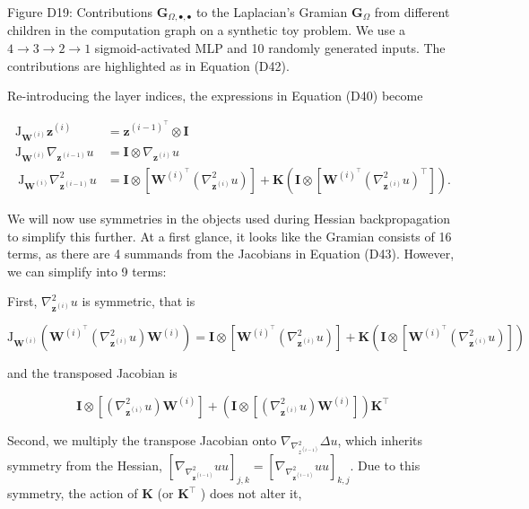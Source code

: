 \documentclass[10pt]{article}
\begin{document}
Figure D19: Contributions $\boldsymbol{G}_{\Omega, \bullet, \bullet}$ to the Laplacian's Gramian $\boldsymbol{G}_{\Omega}$ from different children in the computation graph on a synthetic toy problem. We use a $4 \rightarrow 3 \rightarrow 2 \rightarrow 1$ sigmoid-activated MLP and 10 randomly generated inputs. The contributions are highlighted as in Equation (D42).

Re-introducing the layer indices, the expressions in Equation (D40) become


\begin{align*}
\mathrm{J}_{\boldsymbol{W}^{(i)}} \boldsymbol{z}^{(i)} & =\boldsymbol{z}^{(i-1)^{\top}} \otimes \boldsymbol{I} \\
\mathrm{J}_{\boldsymbol{W}^{(i)}} \nabla_{\boldsymbol{z}^{(i-1)}} u & =\boldsymbol{I} \otimes \nabla_{\boldsymbol{z}^{(i)}} u  \tag{D44}\\
\mathrm{~J}_{\boldsymbol{W}^{(i)}} \nabla_{\boldsymbol{z}^{(i-1)}}^{2} u & =\boldsymbol{I} \otimes\left[\boldsymbol{W}^{(i)^{\top}}\left(\nabla_{\boldsymbol{z}^{(i)}}^{2} u\right)\right]+\boldsymbol{K}\left(\boldsymbol{I} \otimes\left[\boldsymbol{W}^{(i)^{\top}}\left(\nabla_{\boldsymbol{z}^{(i)}}^{2} u\right)^{\top}\right]\right) .
\end{align*}


We will now use symmetries in the objects used during Hessian backpropagation to simplify this further. At a first glance, it looks like the Gramian consists of 16 terms, as there are 4 summands from the Jacobians in Equation (D43). However, we can simplify into 9 terms:

First, $\nabla_{\boldsymbol{z}^{(i)}}^{2} u$ is symmetric, that is

$$
\mathrm{J}_{\boldsymbol{W}^{(i)}}\left(\boldsymbol{W}^{(i)^{\top}}\left(\nabla_{\boldsymbol{z}^{(i)}}^{2} u\right) \boldsymbol{W}^{(i)}\right)=\boldsymbol{I} \otimes\left[\boldsymbol{W}^{(i)^{\top}}\left(\nabla_{\boldsymbol{z}^{(i)}}^{2} u\right)\right]+\boldsymbol{K}\left(\boldsymbol{I} \otimes\left[\boldsymbol{W}^{(i)^{\top}}\left(\nabla_{\boldsymbol{z}^{(i)}}^{2} u\right)\right]\right)
$$

and the transposed Jacobian is

$$
\boldsymbol{I} \otimes\left[\left(\nabla_{\boldsymbol{z}^{(i)}}^{2} u\right) \boldsymbol{W}^{(i)}\right]+\left(\boldsymbol{I} \otimes\left[\left(\nabla_{\boldsymbol{z}^{(i)}}^{2} u\right) \boldsymbol{W}^{(i)}\right]\right) \boldsymbol{K}^{\top}
$$

Second, we multiply the transpose Jacobian onto $\nabla_{\nabla_{z^{(i-1)}}^{2}} \Delta u$, which inherits symmetry from the Hessian, $\left[\nabla_{\nabla_{\boldsymbol{z}^{(i-1)}}^{2}} u u\right]_{j, k}=\left[\nabla_{\nabla_{\boldsymbol{z}^{(i-1)}}^{2}} u u\right]_{k, j}$. Due to this symmetry, the action of $\boldsymbol{K}$ (or $\boldsymbol{K}^{\top}$ ) does not alter it,
\end{document}
